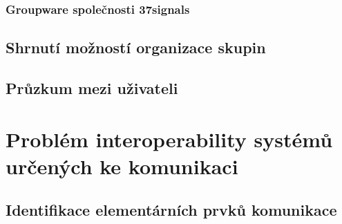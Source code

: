 \documentclass[12pt,oneside,final]{fithesis2}
\begin{document}
\subsection{Groupware společnosti 37signals}\label{37signals}


\section{Shrnutí možností organizace skupin}

\section{Průzkum mezi uživateli}\label{poll}














\chapter{Problém interoperability systémů určených ke komunikaci}\label{interoperabilityProblem}

\section{Identifikace elementárních prvků komunikace}\label{communicationElements}
\end{document}
